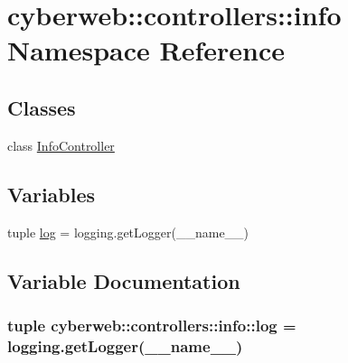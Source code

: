\hypertarget{namespacecyberweb_1_1controllers_1_1info}{\section{cyberweb\-:\-:controllers\-:\-:info \-Namespace \-Reference}
\label{namespacecyberweb_1_1controllers_1_1info}
}
\subsection*{\-Classes}
\begin{DoxyCompactItemize}
\item 
class \hyperlink{classcyberweb_1_1controllers_1_1info_1_1_info_controller}{\-Info\-Controller}
\end{DoxyCompactItemize}
\subsection*{\-Variables}
\begin{DoxyCompactItemize}
\item 
tuple \hyperlink{namespacecyberweb_1_1controllers_1_1info_af63b4a81e718347a7d84f7b7789ce446}{log} = logging.\-get\-Logger(\-\_\-\-\_\-name\-\_\-\-\_\-)
\end{DoxyCompactItemize}


\subsection{\-Variable \-Documentation}
\hypertarget{namespacecyberweb_1_1controllers_1_1info_af63b4a81e718347a7d84f7b7789ce446}{
\subsubsection[{log}]{\setlength{\rightskip}{0pt plus 5cm}tuple {\bf cyberweb\-::controllers\-::info\-::log} = logging.\-get\-Logger(\-\_\-\-\_\-name\-\_\-\-\_\-)}}\label{namespacecyberweb_1_1controllers_1_1info_af63b4a81e718347a7d84f7b7789ce446}
